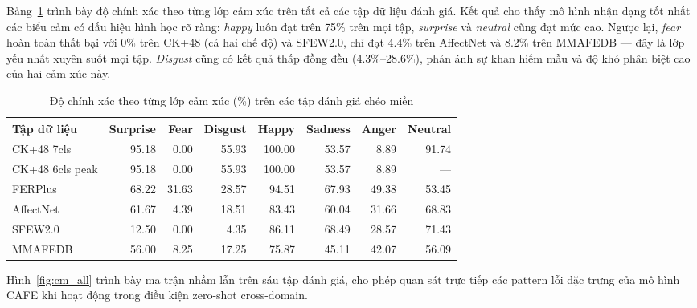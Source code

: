 Bảng~\ref{tab:per_class_acc} trình bày độ chính xác theo từng lớp cảm xúc trên tất cả các tập dữ liệu đánh giá. Kết quả cho thấy mô hình nhận dạng tốt nhất các biểu cảm có dấu hiệu hình học rõ ràng: \textit{happy} luôn đạt trên 75\% trên mọi tập, \textit{surprise} và \textit{neutral} cũng đạt mức cao. Ngược lại, \textit{fear} hoàn toàn thất bại với 0\% trên CK+48 (cả hai chế độ) và SFEW2.0, chỉ đạt 4.4\% trên AffectNet và 8.2\% trên MMAFEDB --- đây là lớp yếu nhất xuyên suốt mọi tập. \textit{Disgust} cũng có kết quả thấp đồng đều (4.3\%--28.6\%), phản ánh sự khan hiếm mẫu và độ khó phân biệt cao của hai cảm xúc này.

\begin{table}[htbp]
\centering
\caption{Độ chính xác theo từng lớp cảm xúc (\%) trên các tập đánh giá chéo miền}
\label{tab:per_class_acc}
\setlength{\tabcolsep}{4pt}
\begin{tabular}{lrrrrrrr}
\hline
\textbf{Tập dữ liệu} & \textbf{Surprise} & \textbf{Fear} & \textbf{Disgust} & \textbf{Happy} & \textbf{Sadness} & \textbf{Anger} & \textbf{Neutral} \\
\hline
CK+48 7cls      & 95.18 & 0.00  & 55.93 & 100.00 & 53.57 &  8.89 & 91.74 \\
CK+48 6cls peak & 95.18 & 0.00  & 55.93 & 100.00 & 53.57 &  8.89 & --- \\
FERPlus         & 68.22 & 31.63 & 28.57 &  94.51 & 67.93 & 49.38 & 53.45 \\
AffectNet       & 61.67 &  4.39 & 18.51 &  83.43 & 60.04 & 31.66 & 68.83 \\
SFEW2.0         & 12.50 &  0.00 &  4.35 &  86.11 & 68.49 & 28.57 & 71.43 \\
MMAFEDB         & 56.00 &  8.25 & 17.25 &  75.87 & 45.11 & 42.07 & 56.09 \\
\hline
\end{tabular}
\end{table}

Hình~\ref{fig:cm_all} trình bày ma trận nhầm lẫn trên sáu tập đánh giá, cho phép quan sát trực tiếp các pattern lỗi đặc trưng của mô hình CAFE khi hoạt động trong điều kiện zero-shot cross-domain.

